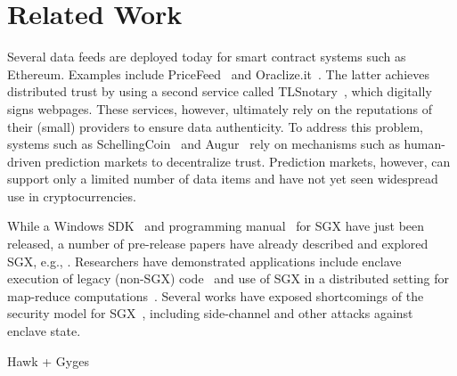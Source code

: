 \section{Related Work}

Several data feeds are deployed today for smart contract systems such as Ethereum. Examples include PriceFeed~\cite{PriceFeed:2016} and Oraclize.it~\cite{Oraclize:2016}. The latter achieves distributed trust by using a second service called TLSnotary~\cite{TLSnotary}, which digitally signs webpages. These services, however, ultimately rely on the reputations of their (small) providers to ensure data authenticity.  To address this problem, systems such as SchellingCoin~\cite{schellingcoin} and Augur~\cite{augur} rely on mechanisms such as human-driven prediction markets to decentralize trust. Prediction markets, however, can support only a limited number of data items and have not yet seen widespread use in cryptocurrencies. 

While a Windows SDK~\cite{sgxsdk} and programming manual~\cite{sgxmanual} for SGX have just been released, a number of pre-release papers have already described and explored SGX, e.g., \cite{Baumann:2015:SAU:2818727.2799647,7163017,7163052,anati2013innovative,McKeen:2013jv,Phegade:2013km}. Researchers have demonstrated applications include enclave execution of legacy (non-SGX) code~\cite{Haven} and use of SGX in a distributed setting for map-reduce computations~\cite{VC3}. Several works have exposed shortcomings of the security model for SGX~\cite{sgxexplained,sgxsok,shihardwaretalk}, including side-channel and other attacks against enclave state. 


Hawk + Gyges
